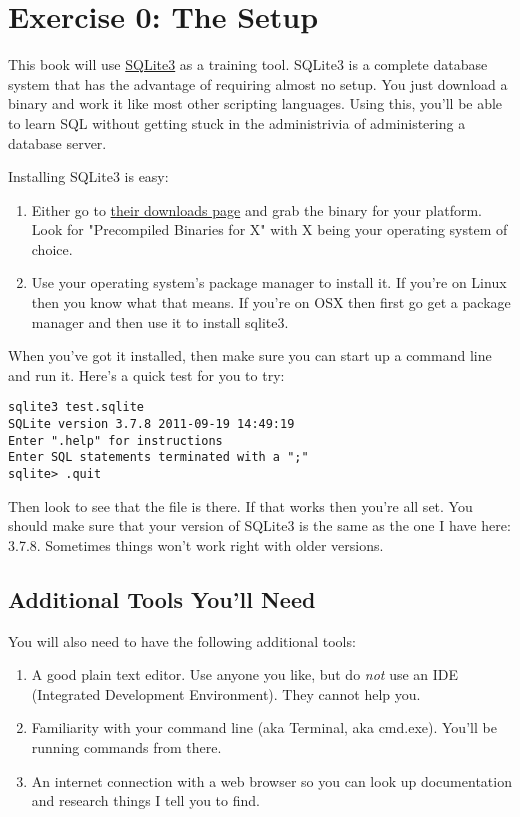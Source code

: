 \chapter{Exercise 0: The Setup}

This book will use \href{http://www.sqlite.org/download.html}{SQLite3} as a training
tool.  SQLite3 is a complete database system that has the advantage of requiring almost
no setup.  You just download a binary and work it like most other scripting languages.
Using this, you'll be able to learn SQL without getting stuck in the administrivia of
administering a database server.

Installing SQLite3 is easy:

\begin{enumerate}
\item Either go to \href{http://www.sqlite.org/download.html}{their downloads page}
    and grab the binary for your platform.  Look for "Precompiled Binaries for X" with
    X being your operating system of choice.
\item Use your operating system's package manager to install it.  If you're on Linux
    then you know what that means.  If you're on OSX then first go get a package
    manager and then use it to install sqlite3.
\end{enumerate}

When you've got it installed, then make sure you can start up a command line and 
run it.  Here's a quick test for you to try:

\begin{lstlisting}
sqlite3 test.sqlite
SQLite version 3.7.8 2011-09-19 14:49:19
Enter ".help" for instructions
Enter SQL statements terminated with a ";"
sqlite> .quit
\end{lstlisting}

Then look to see that the  file is there.  If that works
then you're all set.  You should make sure that your version of SQLite3
is the same as the one I have here: 3.7.8.  Sometimes things won't work
right with older versions.

\section{Additional Tools You'll Need}

You will also need to have the following additional tools:

\begin{enumerate}
\item A good plain text editor.  Use anyone you like, but do \emph{not} use an IDE (Integrated Development Environment).  They cannot help you.
\item Familiarity with your command line (aka Terminal, aka cmd.exe).  You'll be running commands from there.
\item An internet connection with a web browser so you can look up documentation and research things I tell you to find.
\end{enumerate}

